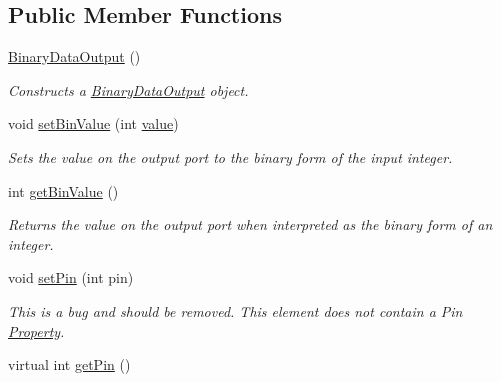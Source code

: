 \subsection*{Public Member Functions}
\begin{DoxyCompactItemize}
\item 
\hyperlink{class_picto_1_1_binary_data_output_a85df0673a421e535373b56fde27f33db}{Binary\-Data\-Output} ()
\begin{DoxyCompactList}\small\item\em Constructs a \hyperlink{class_picto_1_1_binary_data_output}{Binary\-Data\-Output} object. \end{DoxyCompactList}\item 
\hypertarget{class_picto_1_1_binary_data_output_a33c3c57ec2eb6626a4abb5a3e089ee17}{void \hyperlink{class_picto_1_1_binary_data_output_a33c3c57ec2eb6626a4abb5a3e089ee17}{set\-Bin\-Value} (int \hyperlink{class_picto_1_1_binary_data_output_a05e3080cdbc047b4d8612090e89500bb}{value})}\label{class_picto_1_1_binary_data_output_a33c3c57ec2eb6626a4abb5a3e089ee17}

\begin{DoxyCompactList}\small\item\em Sets the value on the output port to the binary form of the input integer. \end{DoxyCompactList}\item 
\hypertarget{class_picto_1_1_binary_data_output_abbc8cbf040b8d19232234d557f692612}{int \hyperlink{class_picto_1_1_binary_data_output_abbc8cbf040b8d19232234d557f692612}{get\-Bin\-Value} ()}\label{class_picto_1_1_binary_data_output_abbc8cbf040b8d19232234d557f692612}

\begin{DoxyCompactList}\small\item\em Returns the value on the output port when interpreted as the binary form of an integer. \end{DoxyCompactList}\item 
\hypertarget{class_picto_1_1_binary_data_output_a8db62b3518c9cb0337ff3de01eb794f7}{void \hyperlink{class_picto_1_1_binary_data_output_a8db62b3518c9cb0337ff3de01eb794f7}{set\-Pin} (int pin)}\label{class_picto_1_1_binary_data_output_a8db62b3518c9cb0337ff3de01eb794f7}

\begin{DoxyCompactList}\small\item\em This is a bug and should be removed. This element does not contain a Pin \hyperlink{class_picto_1_1_property}{Property}. \end{DoxyCompactList}\item 
\hypertarget{class_picto_1_1_binary_data_output_acae817968affafc2dcca116bb05ff44a}{virtual int \hyperlink{class_picto_1_1_binary_data_output_acae817968affafc2dcca116bb05ff44a}{get\-Pin} ()}\label{class_picto_1_1_binary_data_output_acae817968affafc2dcca116bb05ff44a}


\end{DoxyCompactItemize}
